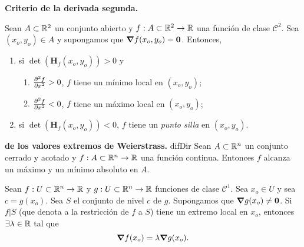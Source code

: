 \begin{theorem}\textbf{Criterio de la derivada segunda.} \label{teo:derivada_2da}
\mbox{}

 Sean $A \subset \mathbb{R}^2$ un conjunto abierto y $f: A \subset \mathbb{R}^2 \to \mathbb{R}$ una funci\'on de clase $\mathcal{C}^2$. Sea $(x_o,y_o) \in A$ y supongamos que $\grad f(x_o,y_o) = \mathbf{0}$. Entonces,  
 \begin{enumerate} %
    \item si $\det(\mathbf{H}_f (x_o,y_o)) > 0$ y
    \begin{enumerate} %
        \item $\pdv[2]{f}{x} (x_o,y_o) > 0$, $f$ tiene un m\'inimo local en $(x_o,y_o)$;
        \item $\pdv[2]{f}{x} (x_o,y_o) < 0$, $f$ tiene un m\'aximo local en $(x_o,y_o)$;
    \end{enumerate}
    \item si $\det(\mathbf{H}_f (x_o,y_o)) < 0$, $f$ tiene un \emph{punto silla} en $(x_o,y_o)$.
 \end{enumerate}

\end{theorem}

\begin{theorem}\textbf{de los valores extremos de Weierstrass.} \label{teo:weier}difDir
  Sean $A \subset \mathbb{R}^n$ un conjunto cerrado y acotado y $f: A \subset \mathbb{R}^n \to \mathbb{R}$ una funci\'on continua. Entonces $f$ alcanza un m\'aximo y un m\'inimo absoluto en $A$.
\end{theorem}

\begin{theorem}  \label{teo:lagrange}
    Sean $f:U \subset \mathbb{R}^n \to \mathbb{R}$ y $g:U \subset \mathbb{R}^n \to \mathbb{R}$ funciones de clase $\mathcal{C}^1$. Sea $x_o \in U$ y sea $c = g(x_o)$. Sea $S$ el conjunto de nivel $c$ de $g$. Supongamos que $\grad g (x_o) \ne \mathbf{0}$. Si $f|S$ (que denota a la restricci\'on de $f$ a $S$) tiene un extremo local en $x_o$, entonces $\exists \lambda \in \mathbb{R}$ tal que
    \[
     \grad f (x_o) = \lambda \grad g (x_o).
    \]
\end{theorem}
